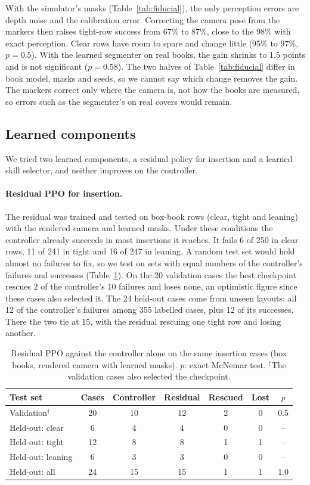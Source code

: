 \documentclass{article}
\begin{document}
With the simulator's masks (Table~\ref{tab:fiducial}), the only perception errors are depth noise and the calibration error. Correcting the camera pose from the
markers then raises tight-row success from 67\% to 87\%, close to the 98\% with exact perception. Clear
rows have room to spare and change little (95\% to 97\%, $p = 0.5$). With the learned segmenter on real
books, the gain shrinks to 1.5 points and is not significant ($p = 0.58$). The two halves of
Table~\ref{tab:fiducial} differ in book model, masks and seeds, so we cannot say which change removes the
gain. The markers correct only where the camera is, not how the books are measured, so errors such as the
segmenter's on real covers would remain.

\subsection{Learned components}
We tried two learned components, a residual policy for insertion and a learned skill selector, and
neither improves on the controller.

\paragraph{Residual PPO for insertion.} The residual was trained and tested on box-book rows (clear, tight
and leaning) with the rendered camera and learned masks. Under these conditions the controller already
succeeds in most insertions it reaches. It fails 6 of 250 in clear rows, 11 of 241 in tight and 16 of 247
in leaning. A random test set would hold almost no failures to fix, so we test on sets with equal numbers
of the controller's failures and successes (Table~\ref{tab:residual}). On the 20 validation cases the best
checkpoint rescues 2 of the controller's 10 failures and loses none, an optimistic figure since these cases
also selected it. The 24 held-out cases come from unseen layouts: all 12 of the controller's failures among
355 labelled cases, plus 12 of its successes. There the two tie at 15, with the residual rescuing one tight
row and losing another.

\begin{table}[t]
\centering
\caption{Residual PPO against the controller alone on the same insertion cases (box books, rendered camera
with learned masks). $p$: exact McNemar test. $^\dagger$The validation cases also selected the checkpoint.}
\label{tab:residual}
\begin{tabular}{lcccccc}
\toprule
Test set & Cases & Controller & Residual & Rescued & Lost & $p$ \\
\midrule
Validation$^\dagger$ & 20 & 10 & 12 & 2 & 0 & 0.5 \\
\midrule
Held-out: clear      &  6 &  4 &  4 & 0 & 0 & -- \\
Held-out: tight      & 12 &  8 &  8 & 1 & 1 & -- \\
Held-out: leaning    &  6 &  3 &  3 & 0 & 0 & -- \\
Held-out: all        & 24 & 15 & 15 & 1 & 1 & 1.0 \\
\bottomrule
\end{tabular}
\end{table}
\end{document}
